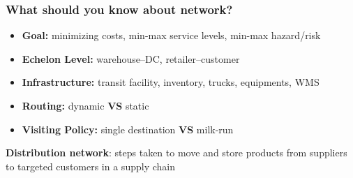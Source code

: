 \documentclass[10pt,handout,notes=show]{beamer}
\begin{document}
\begin{frame}
  \frametitle{What should you know about network?}

  \begin{itemize}
    \item \textbf{Goal:} \alert<2->{minimizing costs}, min-max service levels, min-max hazard/risk
    \item \textbf{Echelon Level:} warehouse--DC, retailer--customer
    \item \textbf{Infrastructure:} \alert<2->{transit facility}, inventory, trucks, equipments, WMS
    \item \textbf{Routing:} dynamic \textbf{VS} static
    \item \textbf{Visiting Policy:} single destination \textbf{VS} \alert<2->{milk-run}
  \end{itemize}

  \NextLine
  \begin{alertblock}{}{}
    \textbf{Distribution network}: steps taken to \alert{move} and \alert{store} products from suppliers to targeted customers in a supply chain
  \end{alertblock}

 \end{frame}
\end{document}
